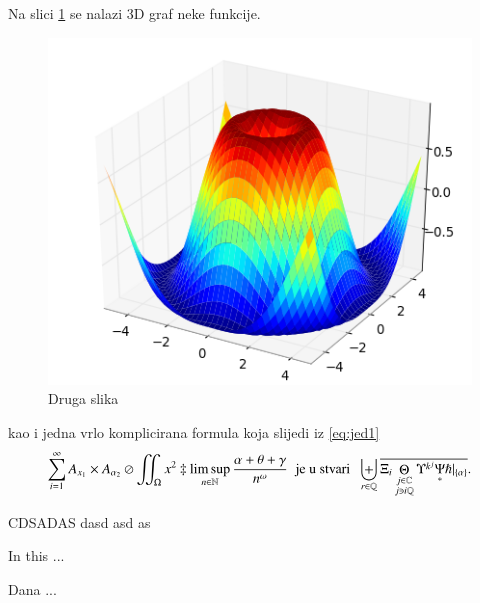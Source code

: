 \documentclass[a4paper,twoside,12pt]{memoir} %
\begin{document}
Na slici \ref{fig:3d} se nalazi 3D graf neke funkcije. 

\begin{figure}[h!t]
\centering \includegraphics{surface3d.png}
\caption{Druga slika}
\label{fig:3d}
\end{figure}

kao i jedna vrlo komplicirana formula koja slijedi iz \eqref{eq:jed1}
\[ \sum_{i=1}^{\infty}A_{x_1}\times A_{{\alpha}_2}\oslash\iint_{\Omega}x^2\ddagger\limsup_{n\in\mathbb{N}}\frac{\alpha+\theta+\gamma}{n^{\omega}}\;\;\text{je u stvari}\;\;\biguplus_{r\in\mathbb{Q}}\overline{\Xi_i \mathop\Theta_{\substack{j\in\mathbb{C} \\ j\ni i\mathbb{Q}}} \Upsilon^{k^j} \underset{\ast}{\Psi} \hslash\vert_{\{\alpha\}}}.\]




\pagestyle{empty} %


\begin{sazetak}
CDSADAS dasd asd as
\end{sazetak}

\begin{summary}
In this ...
\end{summary}


\begin{cv}
Dana ...
\end{cv}
\end{document}
